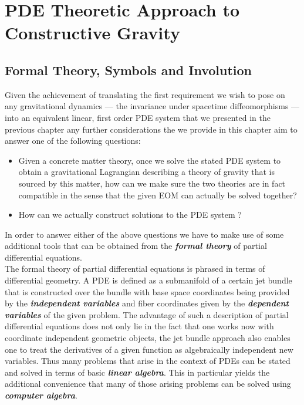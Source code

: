 \documentclass[a4paper,12pt, DIV=14, BCOR=5mm, twoside, headsepline, numbers=noenddot]{scrbook}
\begin{document}
\chapter{PDE Theoretic Approach to Constructive Gravity}
\section{Formal Theory, Symbols and Involution}
Given the achievement of translating the first requirement we wish to pose on any gravitational dynamics --- the invariance under spacetime diffeomorphisms --- into an equivalent linear, first order PDE system that we presented in the previous chapter any further considerations the we provide in this chapter aim to answer one of the following questions:
\begin{itemize}
    \item Given a concrete matter theory, once we solve the stated PDE system to obtain a gravitational Lagrangian describing a theory of gravity that is sourced by this matter, how can we make sure the two theories are in fact compatible in the sense that the given EOM can actually be solved together?
    \item How can we actually construct solutions to the PDE system ?
\end{itemize}
In order to answer either of the above questions we have to make use of some additional tools that can be obtained from the \textit{\textbf{formal theory}} of partial differential equations.\\

The formal theory of partial differential equations is phrased in terms of differential geometry. A PDE is defined as a submanifold of a certain jet bundle that is constructed over the bundle with base space coordinates being provided by the \textit{\textbf{independent variables}} and fiber coordinates given by the \textit{\textbf{dependent variables}} of the given problem. The advantage of such a description of partial differential equations does not only lie in the fact that one works now with coordinate independent geometric objects, the jet bundle approach also enables one to treat the derivatives of a given function as algebraically independent new variables. Thus many problems that arise in the context of PDEs can be stated and solved in terms of basic \textit{\textbf{linear algebra}}. This in particular yields the additional convenience that many of those arising problems can be solved using \textbf{\textit{computer algebra}}.
\end{document}
